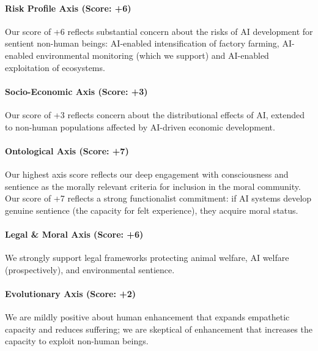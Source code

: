 \paragraph{Risk Profile Axis (Score:
+6)}\label{risk-profile-axis-score-6-3}

Our score of +6 reflects substantial concern about the risks of AI
development for sentient non-human beings: AI-enabled intensification of
factory farming, AI-enabled environmental monitoring (which we support)
and AI-enabled exploitation of ecosystems.

\paragraph{Socio-Economic Axis (Score:
+3)}\label{socio-economic-axis-score-3-4}

Our score of +3 reflects concern about the distributional effects of AI,
extended to non-human populations affected by AI-driven economic
development.

\paragraph{Ontological Axis (Score: +7)}\label{ontological-axis-score-7}

Our highest axis score reflects our deep engagement with consciousness
and sentience as the morally relevant criteria for inclusion in the
moral community. Our score of +7 reflects a strong functionalist
commitment: if AI systems develop genuine sentience (the capacity for
felt experience), they acquire moral status.

\paragraph{Legal \& Moral Axis (Score:
+6)}\label{legal-moral-axis-score-6-2}

We strongly support legal frameworks protecting animal welfare, AI
welfare (prospectively), and environmental sentience.

\paragraph{Evolutionary Axis (Score:
+2)}\label{evolutionary-axis-score-2-2}

We are mildly positive about human enhancement that expands empathetic
capacity and reduces suffering; we are skeptical of enhancement that
increases the capacity to exploit non-human beings.

